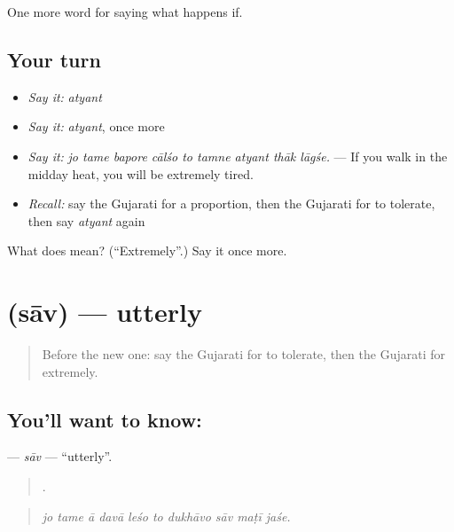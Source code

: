\begin{grammarlens}[title={What you've built}]
One more word for saying what happens if.
\end{grammarlens}

\subsection*{Your turn}
\begin{itemize}
\raggedright
  \item \emph{Say it:} \emph{atyant}
  \item \emph{Say it:} \emph{atyant}, once more
  \item \emph{Say it:} \emph{jo tame bapore cālśo to tamne atyant thāk lāgśe.} — If you walk in the midday heat, you will be extremely tired.
  \item \emph{Recall:} say the Gujarati for a proportion, then the Gujarati for to tolerate, then say \emph{atyant} again
\end{itemize}

\begin{tcolorbox}[breakable,colback=teal!4,colframe=teal!35!black,title={Before you move on}]
What does  mean? (\textquotedblleft{}Extremely\textquotedblright{}.) Say it once more.
\end{tcolorbox}
\section[\texorpdfstring{\gu{સાવ} (sāv)}{સાવ (sāv)}]{ (sāv) — utterly}

\label{lesson:GU-C379-sav}



\begin{quote}
Before the new one: say the Gujarati for to tolerate, then the Gujarati for extremely.
\end{quote}

\subsection*{You'll want to know: }
\textbf{} — \emph{sāv} — \textquotedblleft{}utterly\textquotedblright{}.

\begin{quote}
         .
\end{quote}

\begin{quote}
\emph{jo tame ā davā leśo to dukhāvo sāv maṭī jaśe.}
\end{quote}

